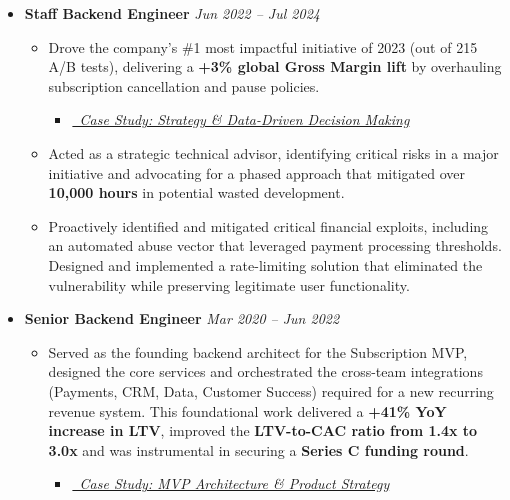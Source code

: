 \documentclass[a4paper,11pt]{article}
\newcommand{\resumeItem}[1]{
  \item\small{
    {#1 \vspace{-2pt}}
  }
}
\begin{document}
\begin{itemize}[leftmargin=*, topsep=4pt, partopsep=0pt, itemsep=8pt, parsep=0pt] %
    \item \textbf{Staff Backend Engineer} \hfill \textit{Jun 2022 – Jul 2024}
        \begin{itemize}[leftmargin=1.5em, topsep=2pt, itemsep=4pt]
                \item Drove the company's \#1 most impactful initiative of 2023 (out of 215 A/B tests), delivering a \textbf{+3\% global Gross Margin lift} by overhauling subscription cancellation and pause policies.
                \begin{itemize}[leftmargin=1.5em, topsep=0pt, itemsep=0pt, partopsep=0pt, parsep=0pt]
                    \item[] \href{https://www.isaacbernat.com/cv#casestudy-postpone-billing}{\textit{\small \faArrowCircleRight\ Case Study: Strategy \& Data-Driven Decision Making}}
                    \end{itemize}
                \item Acted as a strategic technical advisor, identifying critical risks in a major initiative and advocating for a phased approach that mitigated over \textbf{10,000 hours} in potential wasted development.
                \item Proactively identified and mitigated critical financial exploits, including an automated abuse vector that leveraged payment processing thresholds. Designed and implemented a rate-limiting solution that eliminated the vulnerability while preserving legitimate user functionality.

            \end{itemize}
        
        \item \textbf{Senior Backend Engineer} \hfill \textit{Mar 2020 – Jun 2022}
            \begin{itemize}[leftmargin=1.5em, topsep=2pt, itemsep=4pt]
                \item Served as the founding backend architect for the Subscription MVP, designed the core services and orchestrated the cross-team integrations (Payments, CRM, Data, Customer Success) required for a new recurring revenue system. This foundational work delivered a \textbf{+41\% YoY increase in LTV}, improved the \textbf{LTV-to-CAC ratio from 1.4x to 3.0x} and was instrumental in securing a \textbf{Series C funding round}.
                    \begin{itemize}[leftmargin=1.5em, topsep=0pt, itemsep=0pt, partopsep=0pt, parsep=0pt]
                    \item[] \href{https://www.isaacbernat.com/cv#casestudy-subscription-model}{\textit{\small \faArrowCircleRight\ Case Study: MVP Architecture & Product Strategy}}
                    \end{itemize}    
                    

\end{itemize}
\end{itemize}
\end{document}
